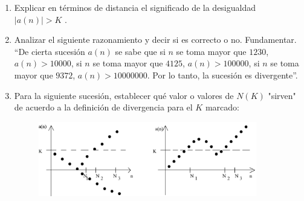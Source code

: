\documentclass[12pt]{article}
\theoremstyle{definition}
\newtheorem*{mydef}{Definición}
\begin{document}
\begin{enumerate}
\vspace{0.5 cm}

\item Explicar en términos de distancia el significado de la desigualdad $|a(n)| > K$ .

\item Analizar el siguiente razonamiento y decir si es correcto o no. Fundamentar.\\
“De cierta sucesión $a(n)$ se sabe que si $n$ se toma mayor que $1230$, $a(n) > 10000$, si $n$ se toma mayor que $4125$, $a(n) > 100000$, si $n$ se toma mayor que $9372$, $a(n) > 10000000$. Por lo tanto, la sucesión es divergente”.

\item Para la siguiente sucesión, establecer qué valor o valores de $N(K)$ "sirven" de acuerdo a la definición de divergencia para el $K$ marcado:

\begin{figure}[H]
\centering
\includegraphics[width=0.9\textwidth]{TP3Fig3}
\end{figure}


\end{enumerate}
\end{document}
